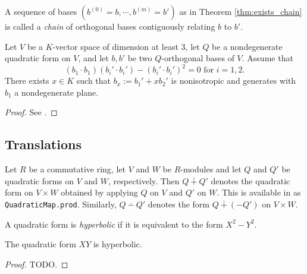 \begin{definition}\label{def:chain}
\leanok
A sequence of bases $(b^{(0)} = b, \cdots, b^{(m)} = b')$ as in Theorem \ref{thm:exists_chain} is called a \emph{chain} of orthogonal bases contiguously relating $b$ to $b'$.
\end{definition}

\begin{lemma}\label{lem:exists_const}
\leanok
Let $V$ be a $K$-vector space of dimension at least $3$, let $Q$ be a nondegenerate quadratic form on $V$, and let $b, b'$ be two $Q$-orthogonal bases of $V$. Assume that 
\[ (b_1 \cdot b_1)(b_i' \cdot b_i') - (b_i' \cdot b_i')^2 = 0 \text{ for } i = 1, 2. \]
There exists $x \in K$ such that $b_x := b_1' + x b_2'$ is nonisotropic and generates with $b_1$ a nondegenerate plane.
\end{lemma}

\begin{proof}
	See \cite[\S IV.1.4, Lemma after Theorem 2]{Ser73}.
\end{proof}

\subsection{Translations}\label{subsec:translations}

Let $R$ be a commutative ring, let $V$ and $W$ be $R$-modules and let $Q$ and $Q'$ be quadratic forms on $V$ and $W$, respectively. Then $Q \dotplus Q'$ denotes the quadratic form on $V \times W$ obtained by applying $Q$ on $V$ and $Q'$ on $W$. This is available in \mathlib as \texttt{QuadraticMap.prod}. Similarly, $Q \dotminus Q'$ denotes the form $Q \dotplus (-Q')$ on $V \times W$.

\begin{definition}\label{def:hyperbolic}
\leanok
A quadratic form is \emph{hyperbolic} if it is equivalent to the form $X^2 - Y^2$.
\end{definition}

\begin{lemma}\label{lem:XY_hyperbolic}
\leanok
{}
The quadratic form $XY$ is hyperbolic.
\end{lemma}

\begin{proof}
TODO.
\end{proof}



